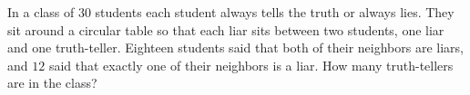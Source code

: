 In a class of $30$ students each student always tells the truth or always lies. They sit around a circular table so that each liar sits between two students, one liar and one truth-teller. Eighteen students said that both of their neighbors are liars, and $12$ said that exactly one of their neighbors is a liar. How many truth-tellers are in the class?
